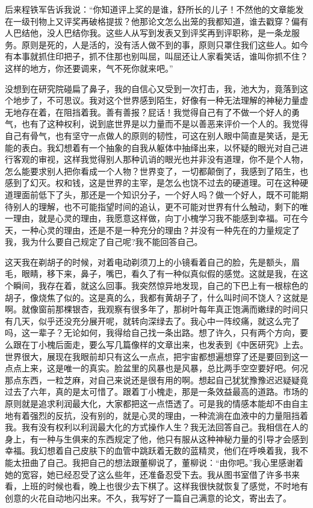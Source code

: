 \documentclass[12pt,oneside]{book}
\begin{document}
后来程铁军告诉我说：``你知道评上奖的是谁，舒所长的儿子！不然他的文章能发在一级刊物上又评奖再破格提拔？他那论文怎么出笼的我都知道，谁去戳穿？偏有人巴结他，没人巴结你我。这些人从写到发表又到评奖再到评职称，是一条龙服务。原则是死的，人是活的，没有活人做不到的事，原则只罩住我们这些人。如今有本事就抓住印把子，抓不住那也别叫屈，叫屈还让人家看笑话，谁叫你抓不住？这样的地方，你还要调来，气不死你就来吧。''

没想到在研究院碰扁了鼻子，我的自信心又受到一次打击，我，池大为，竟落到这个地步了，不可思议。我对这个世界感到陌生，好像有一种无法理解的神秘力量虚无地存在着，在阻挡着我。善有善报？屁话！我觉得自己有了不做一个好人的勇气，也有了这种权利，说到底世界是以力量而不是以善恶来评价一个人的。我觉得自己有骨气，也有坚守一点做人的原则的韧性，可这在别人眼中简直是笑话，是无能的表白。我幻想着有一个抽象的自我从躯体中抽绎出来，以怀疑的眼光对自己进行客观的审视，这样我觉得别人那种讥诮的眼光也并非没有道理，你不是个人物，怎么能要求别人把你看成一个人物？世界变了，一切都颠倒了，我感到了陌生，也感到了幻灭。权和钱，这是世界的主宰，是怎么也饶不过去的硬道理。可在这种硬道理面前低下了头，那还是一个知识分子，一个好人吗？做一个好人，既不可能期待别人的理解，也不可能指望时间的追认，更不可能对世界有什么触动，剩下的唯一理由，就是心灵的理由，我愿意这样做，向丁小槐学习我不能感到幸福。可在今天，一种心灵的理由，还是不是一种充分的理由？并没有一种先在的力量规定了我，我为什么要自己规定了自己呢?我不能回答自己。

这天我在剃胡子的时候，对着电动剃须刀上的小镜看着自己的脸，先是额头，眉毛，眼睛，移下来，鼻子，嘴巴，看久了有一种似真似假的感觉。这就是我，在这个瞬间，我存在着，就这么回事。我突然惊异地发现，自己的下巴上有一根棕色的胡子，像烧焦了似的。这是真的么，我都有黄胡子了，什么叫时间不饶人？这就是啊。就像窗前那棵银杏，我观察有很多年了，那树叶每年真正饱满而嫩绿的时间只有几天，似乎还没充分展开呢，就转向深绿去了。我心中一阵绞痛，就这么完了吗，这一辈子？无论如何，我得给自己找一条出路。想了许久，只有两个方向，要么跟在丁小槐后面走，要么写几篇像样的文章出来，也发表到《中医研究》上去。世界很大，展现在我眼前却只有这么一点点，把宇宙都想遍想穿了还是要回到这一点点上来，这是唯一的真实。脸盆里的风暴也是风暴，总比两手空空要好吧。何况那点东西，一粒芝麻，对自己来说还是很有用的啊。想起自己犹犹豫豫迟迟疑疑竟过去了六年，真的是太可惜了。跟着丁小槐走，那是一条效益最高的道路。市场的原则就是追求利润最大化，大家都把这一点悟透了。可是我的情感本能却不由自主地有着强烈的反抗，没有别的，就是心灵的理由，一种流淌在血液中的力量阻挡着我。我有没有权利以利润最大化的方式操作人生？我无法回答自己。我相信在人的身上，有一种与生俱来的东西规定了他，他只有服从这种神秘力量的引导才会感到幸福。我幻想着自己皮肤下的血管中跳跃着无数的蓝精灵，他们在呼唤着我，我不能太扭曲了自己。我把自己的想法跟董柳说了，董柳说：``由你吧。''我心里感谢着她的宽容，她已经忍受了这么些年，还准备忍受下去。我从图书室借了许多书来看，上班的时候也看，晚上也很少去下棋了。这样我很快就恢复了感觉，不时地有创意的火花自动地闪出来。不久，我写好了一篇自己满意的论文，寄出去了。
\end{document}
